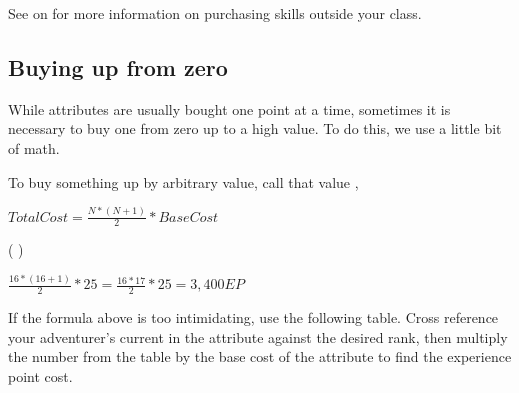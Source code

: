 \begin{multicols*}{2}
See  on  for more information on purchasing skills outside your class.
\subsection{Buying up from zero}
While attributes are usually bought one point at a time, sometimes it is necessary to buy one from zero up to a high value. To do this, we use a little bit of math.

To buy something up by arbitrary value, call that value ,
\begin{normbox}
\large
$Total Cost = \frac{N * (N+1)}{2} * Base Cost$
\end{normbox}
 ( ) 
\begin{normbox}
\large
$\frac{16 * (16+1)}{2} * 25 = \frac{16*17}{2} * 25 = 3,400 EP$
\end{normbox}
If the formula above is too intimidating, use the following table. Cross reference your adventurer's current  in the attribute against the desired rank, then multiply the number from the table by the base cost of the attribute to find the experience point cost.
\end{multicols*}
